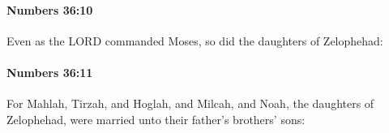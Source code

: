 		\paragraph{Numbers 36:10} %
			\label{NUMBERS-36-10}

			Even as the LORD commanded Moses, so did the daughters of Zelophehad:


		\paragraph{Numbers 36:11} %
			\label{NUMBERS-36-11}

			For Mahlah, Tirzah, and Hoglah, and Milcah, and Noah, the daughters of Zelophehad, were married unto their father’s brothers’ sons:


